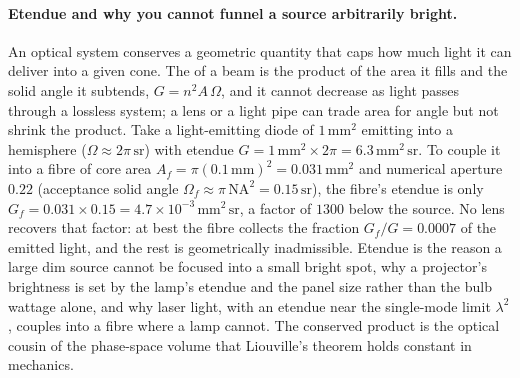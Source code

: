 \paragraph{Etendue and why you cannot funnel a source arbitrarily bright.} An
optical system conserves a geometric quantity that caps how much light it can
deliver into a given cone. The  of a beam is the product of the
area it fills and the solid angle it subtends, $G = n^2 A\,\Omega$, and it
cannot decrease as light passes through a lossless system; a lens or a light pipe
can trade area for angle but not shrink the product. Take a light-emitting diode
of $1\,\si{\milli\meter\squared}$ emitting into a hemisphere
($\Omega \approx 2\pi\,\si{\steradian}$) with etendue
$G = 1\,\si{\milli\meter\squared}\times 2\pi = 6.3\,\si{\milli\meter\squared\,
\steradian}$. To couple it into a fibre of core area
$A_f = \pi(0.1\,\si{\milli\meter})^2 = 0.031\,\si{\milli\meter\squared}$ and
numerical aperture $0.22$ (acceptance solid angle
$\Omega_f \approx \pi\,\text{NA}^2 = 0.15\,\si{\steradian}$), the fibre's
etendue is only $G_f = 0.031\times 0.15 = 4.7\times 10^{-3}\,\si{\milli\meter
\squared\,\steradian}$, a factor of $1300$ below the source. No lens recovers
that factor: at best the fibre collects the fraction $G_f/G = 0.0007$ of the
emitted light, and the rest is geometrically inadmissible. Etendue is the reason
a large dim source cannot be focused into a small bright spot, why a projector's
brightness is set by the lamp's etendue and the panel size rather than the bulb
wattage alone, and why laser light, with an etendue near the single-mode limit
$\lambda^2$, couples into a fibre where a lamp cannot. The conserved product is
the optical cousin of the phase-space volume that Liouville's theorem holds
constant in mechanics.

